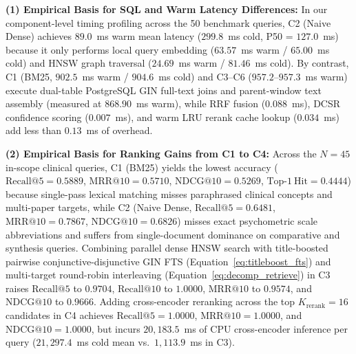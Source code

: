 \documentclass[10pt]{SPIIRAS_Proceedings}
\begin{document}
\textbf{(1) Empirical Basis for SQL and Warm Latency Differences:} In our component-level timing profiling across the 50 benchmark queries, C2 (Naive Dense) achieves $89.0$~ms warm mean latency ($299.8$~ms cold, P50 = $127.0$~ms) because it only performs local query embedding ($63.57$~ms warm / $65.00$~ms cold) and HNSW graph traversal ($24.69$~ms warm / $81.46$~ms cold). By contrast, C1 (BM25, $902.5$~ms warm / $904.6$~ms cold) and C3--C6 ($957.2$--$957.3$~ms warm) execute dual-table PostgreSQL GIN full-text joins and parent-window text assembly (measured at $868.90$~ms warm), while RRF fusion ($0.088$~ms), DCSR confidence scoring ($0.007$~ms), and warm LRU rerank cache lookup ($0.034$~ms) add less than $0.13$~ms of overhead.

\textbf{(2) Empirical Basis for Ranking Gains from C1 to C4:} Across the $N = 45$ in-scope clinical queries, C1 (BM25) yields the lowest accuracy ($\mathrm{Recall@5} = 0.5889$, $\mathrm{MRR@10} = 0.5710$, $\mathrm{NDCG@10} = 0.5269$, $\mathrm{Top\text{-}1\ Hit} = 0.4444$) because single-pass lexical matching misses paraphrased clinical concepts and multi-paper targets, while C2 (Naive Dense, $\mathrm{Recall@5} = 0.6481$, $\mathrm{MRR@10} = 0.7867$, $\mathrm{NDCG@10} = 0.6826$) misses exact psychometric scale abbreviations and suffers from single-document dominance on comparative and synthesis queries. Combining parallel dense HNSW search with title-boosted pairwise conjunctive-disjunctive GIN FTS (Equation~\ref{eq:titleboost_fts}) and multi-target round-robin interleaving (Equation~\ref{eq:decomp_retrieve}) in C3 raises $\mathrm{Recall@5}$ to $0.9704$, $\mathrm{Recall@10}$ to $1.0000$, $\mathrm{MRR@10}$ to $0.9574$, and $\mathrm{NDCG@10}$ to $0.9666$. Adding cross-encoder reranking across the top $K_{\mathrm{rerank}} = 16$ candidates in C4 achieves $\mathrm{Recall@5} = 1.0000$, $\mathrm{MRR@10} = 1.0000$, and $\mathrm{NDCG@10} = 1.0000$, but incurs $20,183.5$~ms of CPU cross-encoder inference per query ($21,297.4$~ms cold mean vs.\ $1,113.9$~ms in C3).
\end{document}
